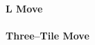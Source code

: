     \paragraph{L Move} %
    \label{par:l}
    

    \paragraph{Three--Tile Move} %
    \label{par:three_tile_move}
    

%
%
%
%
%


    
